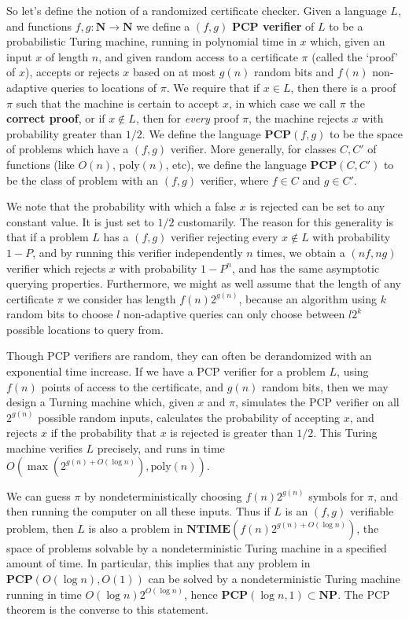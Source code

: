 So let's define the notion of a randomized certificate checker. Given a language $L$, and functions $f,g: \mathbf{N} \to \mathbf{N}$ we define a $(f,g)$ {\bf PCP verifier} of $L$ to be a probabilistic Turing machine, running in polynomial time in $x$ which, given an input $x$ of length $n$, and given random access to a certificate $\pi$ (called the `proof' of $x$), accepts or rejects $x$ based on at most $g(n)$ random bits and $f(n)$ non-adaptive queries to locations of $\pi$. We require that if $x \in L$, then there is a proof $\pi$ such that the machine is certain to accept $x$, in which case we call $\pi$ the {\bf correct proof}, or if $x \not \in L$, then for {\it every} proof $\pi$, the machine rejects $x$ with probability greater than $1/2$. We define the language $\mathbf{PCP}(f,g)$ to be the space of problems which have a $(f,g)$ verifier. More generally, for classes $C, C'$ of functions (like $O(n)$, $\text{poly}(n)$, etc), we define the language $\mathbf{PCP}(C,C')$ to be the class of problem with an $(f,g)$ verifier, where $f \in C$ and $g \in C'$.

We note that the probability with which a false $x$ is rejected can be set to any constant value. It is just set to $1/2$ customarily. The reason for this generality is that if a problem $L$ has a $(f,g)$ verifier rejecting every $x \not \in L$ with probability $1 - P$, and by running this verifier independently $n$ times, we obtain a $(nf,ng)$ verifier which rejects $x$ with probability $1 - P^n$, and has the same asymptotic querying properties. Furthermore, we might as well assume that the length of any certificate $\pi$ we consider has length $f(n)2^{g(n)}$, because an algorithm using $k$ random bits to choose $l$ non-adaptive queries can only choose between $l2^k$ possible locations to query from.

Though PCP verifiers are random, they can often be derandomized with an exponential time increase. If we have a PCP verifier for a problem $L$, using $f(n)$ points of access to the certificate, and $g(n)$ random bits, then we may design a Turning machine which, given $x$ and $\pi$, simulates the PCP verifier on all $2^{g(n)}$ possible random inputs, calculates the probability of accepting $x$, and rejects $x$ if the probability that $x$ is rejected is greater than $1/2$. This Turing machine verifies $L$ precisely, and runs in time $O(\max(2^{g(n) + O(\log n)}), \text{poly}(n))$.

We can guess $\pi$ by nondeterministically choosing $f(n)2^{g(n)}$ symbols for $\pi$, and then running the computer on all these inputs. Thus if $L$ is an $(f,g)$ verifiable problem, then $L$ is also a problem in $\mathbf{NTIME}(f(n)2^{g(n) + O(\log n)})$, the space of problems solvable by a nondeterministic Turing machine in a specified amount of time. In particular, this implies that any problem in $\mathbf{PCP}(O(\log n), O(1))$ can be solved by a nondeterministic Turing machine running in time $O(\log n) 2^{O(\log n)}$, hence $\mathbf{PCP}(\log n, 1) \subset \mathbf{NP}$. The PCP theorem is the converse to this statement.

